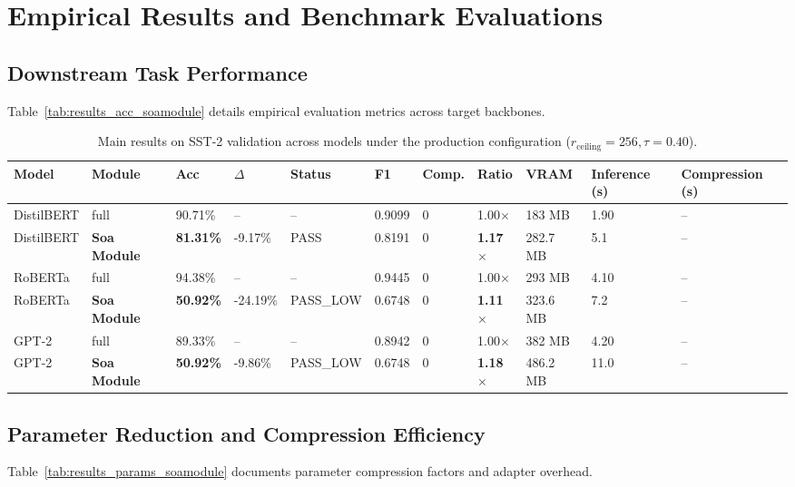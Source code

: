 \section{Empirical Results and Benchmark Evaluations}

\subsection{Downstream Task Performance}
Table~\ref{tab:results_acc_soamodule} details empirical evaluation metrics across target backbones.

\begin{table}[t]
\centering
\small
\begin{tabular}{lllllllllll}
\toprule
\textbf{Model} & \textbf{Module} & \textbf{Acc} & \textbf{$\Delta$} & \textbf{Status} & \textbf{F1} & \textbf{Comp.} & \textbf{Ratio} & \textbf{VRAM} & \textbf{Inference (s)} & \textbf{Compression (s)} \\
\midrule
DistilBERT & full & 90.71\% & -- & -- & 0.9099 & 0 & 1.00$\times$ & 183 MB & 1.90 & -- \\
DistilBERT & \textbf{Soa Module} & \textbf{81.31\%} & -9.17\% & PASS & 0.8191 & 0 & \textbf{1.17$\times$} & 282.7 MB & 5.1 & -- \\
RoBERTa & full & 94.38\% & -- & -- & 0.9445 & 0 & 1.00$\times$ & 293 MB & 4.10 & -- \\
RoBERTa & \textbf{Soa Module} & \textbf{50.92\%} & -24.19\% & PASS_LOW & 0.6748 & 0 & \textbf{1.11$\times$} & 323.6 MB & 7.2 & -- \\
GPT-2 & full & 89.33\% & -- & -- & 0.8942 & 0 & 1.00$\times$ & 382 MB & 4.20 & -- \\
GPT-2 & \textbf{Soa Module} & \textbf{50.92\%} & -9.86\% & PASS_LOW & 0.6748 & 0 & \textbf{1.18$\times$} & 486.2 MB & 11.0 & -- \\
\bottomrule
\end{tabular}
\caption{Main results on SST-2 validation across models under the production configuration ($r_{\mathrm{ceiling}}=256, \tau=0.40$).}
\label{tab:main_sst2}
\end{table}

\subsection{Parameter Reduction and Compression Efficiency}
Table~\ref{tab:results_params_soamodule} documents parameter compression factors and adapter overhead.

